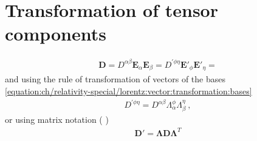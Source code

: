 \documentclass[letterpaper,10pt,english]{jupyterBook}
\begin{document}
\section{Transformation of tensor components}
\label{\detokenize{ch/relativity-special/lorentz:transformation-of-tensor-components}}\begin{equation*}
\begin{split}\mathbf{D} = D^{\alpha \beta} \mathbf{E}_{\alpha} \mathbf{E}_{\beta} = D^{'\phi \eta} \mathbf{E}'_{\phi} \mathbf{E}'_{\eta} = \end{split}
\end{equation*}
\sphinxAtStartPar
and using the rule of transformation of vectors of the bases \eqref{equation:ch/relativity-special/lorentz:vector:transformation:bases}
\begin{equation*}
\begin{split}D^{' \phi \eta} = D^{\alpha \beta} \Lambda^{\phi}_{\alpha} \Lambda^{\eta}_{\beta} \ ,\end{split}
\end{equation*}
\sphinxAtStartPar
or using matrix notation ( )
\begin{equation*}
\begin{split}\mathbf{D}' = \symbf{\Lambda} \mathbf{D} \symbf{\Lambda}^T\end{split}
\end{equation*}\label{None:example-1}
\end{document}
